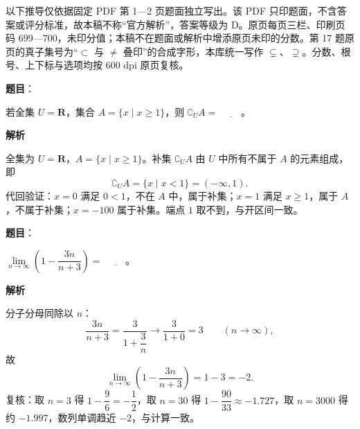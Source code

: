 

\begin{gktip}
以下推导仅依据固定 PDF 第 1—2 页题面独立写出。该 PDF 只印题面，不含答案或评分标准，故本稿不称“官方解析”，答案等级为 D。原页每页三栏、印刷页码 699—700，未印分值；本稿不在题面或解析中增添原页未印的分数。第 17 题原页的真子集号为“$\subset$ 与 $\neq$ 叠印”的合成字形，本库统一写作 $\subsetneq$、$\supsetneq$。分数、根号、上下标与选项均按 600 dpi 原页复核。
\end{gktip}

\begin{answer}

\textbf{题目}：

若全集 $U=\mathbf R$，集合 $A=\{x\mid x\geqslant 1\}$，则 $\complement_U A=$ $\underline{\qquad}$。

\textbf{解析}

全集为 $U=\mathbf R$，$A=\{x\mid x\geqslant1\}$。补集 $\complement_U A$ 由 $U$ 中所有不属于 $A$ 的元素组成，即
\nopagebreak[4]
\[\complement_U A=\{x\mid x<1\}=(-\infty,1).\]
代回验证：$x=0$ 满足 $0<1$，不在 $A$ 中，属于补集；$x=1$ 满足 $x\geqslant1$，属于 $A$，不属于补集；$x=-100$ 属于补集。端点 $1$ 取不到，与开区间一致。


\end{answer}
\begin{answer}

\textbf{题目}：

$\lim\limits_{n\to\infty}\left(1-\dfrac{3n}{n+3}\right)=$ $\underline{\qquad}$。

\textbf{解析}

分子分母同除以 $n$：
\nopagebreak[4]
\[\frac{3n}{n+3}=\frac{3}{1+\dfrac3n}\longrightarrow\frac{3}{1+0}=3\qquad(n\to\infty),\]
故
\nopagebreak[4]
\[\lim_{n\to\infty}\left(1-\frac{3n}{n+3}\right)=1-3=-2.\]
复核：取 $n=3$ 得 $1-\dfrac96=-\dfrac12$，取 $n=30$ 得 $1-\dfrac{90}{33}\approx-1.727$，取 $n=3000$ 得约 $-1.997$，数列单调趋近 $-2$，与计算一致。


\end{answer}
